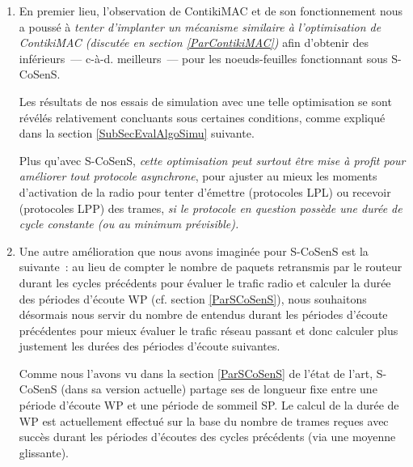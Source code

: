 \begin{enumerate}

\item En premier lieu, l'observation de ContikiMAC et de son fonctionnement
nous a poussé à \emph{tenter d'implanter un mécanisme similaire à
l'optimisation  de ContikiMAC (discutée en section
\vref{ParContikiMAC})} afin d'obtenir des  inférieurs~---
c-à-d. meilleurs~--- pour les noeuds-feuilles fonctionnant sous S-CoSenS.

Les résultats de nos essais de simulation avec une telle optimisation se
sont révélés relativement concluants sous certaines conditions, comme
expliqué dans la section \ref{SubSecEvalAlgoSimu} suivante.

Plus qu'avec S-CoSenS, \emph{cette optimisation peut surtout être mise
à profit pour améliorer tout protocole asynchrone}, pour ajuster au mieux
les moments d'activation de la radio pour tenter d'émettre (protocoles LPL)
ou recevoir (protocoles LPP) des trames, \emph{si le protocole en question
possède une durée de cycle constante (ou au minimum prévisible).}

\smallskip

\item Une autre amélioration que nous avons imaginée pour S-CoSenS est
la suivante~: au lieu de compter le nombre de paquets retransmis par le
routeur durant les cycles précédents pour évaluer le trafic radio et
calculer la durée des périodes d'écoute WP (cf. section \vref{ParSCoSenS}),
nous souhaitons désormais nous servir du nombre de  \footnotemark[3]
entendus durant les périodes d'écoute précédentes pour mieux évaluer
le trafic réseau passant et donc calculer plus justement les durées
des périodes d'écoute suivantes.


\smallskip

Comme nous l'avons vu dans la section \vref{ParSCoSenS} de l'état de l'art,
S-CoSenS (dans sa version actuelle) partage ses  de
longueur fixe entre une période d'écoute WP et une période de sommeil SP.
Le calcul de la durée de WP est actuellement effectué sur la base du
nombre de trames reçues avec succès durant les périodes d'écoutes des
cycles précédents (via une moyenne glissante).


\end{enumerate}
